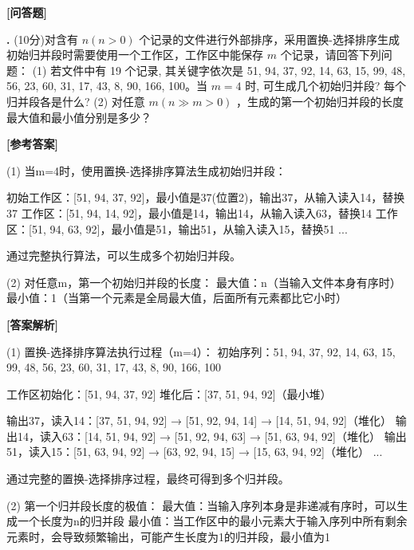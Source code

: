 \documentclass[12pt,a4paper]{article}
\newenvironment{choicequestion}[1][]{%
    \vspace{0.5cm}
    \noindent\textbf{[#1]}
    \vspace{0.2cm}
}{}
\newenvironment{answersection}{%
    \vspace{0.2cm}
    \noindent\textbf{[参考答案]}\\
    \vspace{0.1cm}
}{}
\newenvironment{analysissection}{%
    \vspace{0.2cm}
    \noindent\textbf{[答案解析]}\\
    \vspace{0.1cm}
}{}
\newcounter{questioncounter}
\newcommand{\question}[1]{%
    \stepcounter{questioncounter}%
    \noindent\textbf{\thequestioncounter.} #1%
}
\begin{document}
\begin{choicequestion}[问答题]
\question{(10分)对含有 $n(n > 0)$ 个记录的文件进行外部排序，采用置换-选择排序生成初始归并段时需要使用一个工作区，工作区中能保存 $m$ 个记录，请回答下列问题：\newline
(1) 若文件中有 19 个记录, 其关键字依次是 51, 94, 37, 92, 14, 63, 15, 99, 48, 56, 23, 60, 31, 17, 43, 8, 90, 166, 100。当 $m = 4$ 时, 可生成几个初始归并段? 每个归并段各是什么?  \newline
(2) 对任意 $m (n \gg m > 0)$ ，生成的第一个初始归并段的长度最大值和最小值分别是多少？}{}

\begin{answersection}
(1) 当m=4时，使用置换-选择排序算法生成初始归并段：

初始工作区：[51, 94, 37, 92]，最小值是37(位置2)，输出37，从输入读入14，替换37
工作区：[51, 94, 14, 92]，最小值是14，输出14，从输入读入63，替换14
工作区：[51, 94, 63, 92]，最小值是51，输出51，从输入读入15，替换51
...

通过完整执行算法，可以生成多个初始归并段。

(2) 对任意m，第一个初始归并段的长度：
最大值：n（当输入文件本身有序时）
最小值：1（当第一个元素是全局最大值，后面所有元素都比它小时）
\end{answersection}

\begin{analysissection}
(1) 置换-选择排序算法执行过程（m=4）：
初始序列：51, 94, 37, 92, 14, 63, 15, 99, 48, 56, 23, 60, 31, 17, 43, 8, 90, 166, 100

工作区初始化：[51, 94, 37, 92]
堆化后：[37, 51, 94, 92]（最小堆）

输出37，读入14：[37, 51, 94, 92] → [51, 92, 94, 14] → [14, 51, 94, 92]（堆化）
输出14，读入63：[14, 51, 94, 92] → [51, 92, 94, 63] → [51, 63, 94, 92]（堆化）
输出51，读入15：[51, 63, 94, 92] → [63, 92, 94, 15] → [15, 63, 94, 92]（堆化）
...

通过完整的置换-选择排序过程，最终可得到多个归并段。

(2) 第一个归并段长度的极值：
最大值：当输入序列本身是非递减有序时，可以生成一个长度为n的归并段
最小值：当工作区中的最小元素大于输入序列中所有剩余元素时，会导致频繁输出，可能产生长度为1的归并段，最小值为1
\end{analysissection}
\end{choicequestion}
\end{document}
